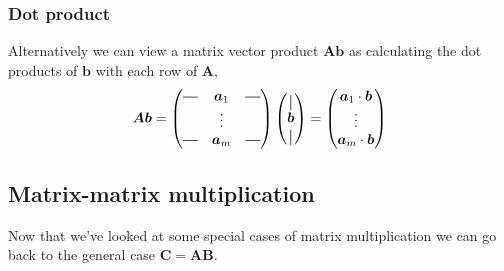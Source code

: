 \subsubsection{Dot product}
Alternatively we can view a matrix vector product $\bm{Ab}$ as 
calculating the dot products of $\bm{b}$ with each row of $\bm{A}$,
\begin{equation}
    \bm{Ab} = \begin{pmatrix}
        \horzbar & \bm{a}_1 & \horzbar \\
                  & \vdots   &  \\
        \horzbar & \bm{a}_m &  \horzbar \\
    \end{pmatrix} 
    \begin{pmatrix}
    \vertbar \\
    \bm{b}  \\
    \vertbar
    \end{pmatrix}= 
    \begin{pmatrix}
    \bm{a}_{1} \cdot \bm{b} \\
    \vdots \\
    \bm{a}_{m} \cdot \bm{b} \\
    \end{pmatrix}
\end{equation}

\subsection{Matrix-matrix multiplication}
Now that we've looked at some special cases of matrix multiplication
we can go back to the general case 
$\bm{C} = \bm{AB}$.

